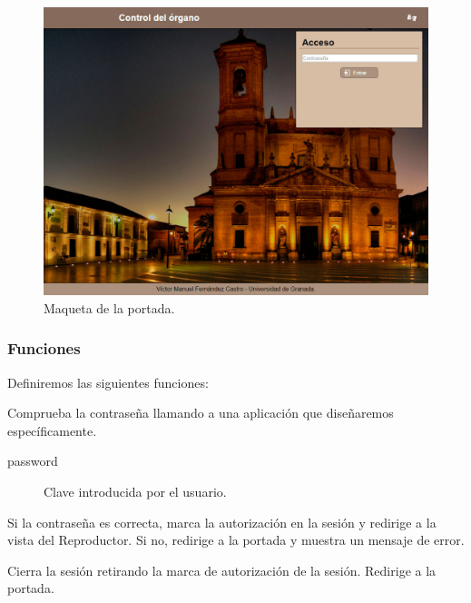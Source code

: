 \begin{figure}[H]
	\noindent \begin{centering}
		\includegraphics[width=\linewidth*3/4]{capitulo4/cap_portada}
		\par\end{centering}
	\smallskip
	\caption{\label{fig:cap_portada} Maqueta de la portada.}
\end{figure}

\smallskip

\subsubsection{Funciones}

Definiremos las siguientes funciones:

\begin{description}[style=nextline]
	\item[login (password)]
	Comprueba la contraseña llamando a una aplicación que diseñaremos específicamente.
	
	\begin{description}
		\item[password] Clave introducida por el usuario.
	\end{description}
	
	Si la contraseña es correcta, marca la autorización en la sesión y redirige a la vista del Reproductor. Si no, redirige a la portada y muestra un mensaje de error.
	
	\item[logout ()]
	Cierra la sesión retirando la marca de autorización de la sesión. Redirige a la portada.
	
\end{description}

